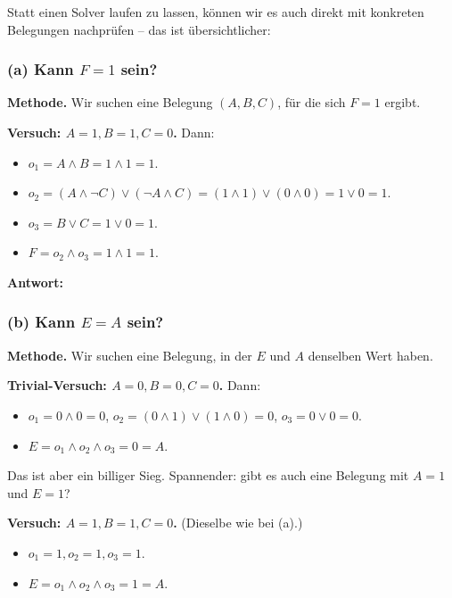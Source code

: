 \documentclass[a4paper,12pt]{article}
\begin{document}
Statt einen Solver laufen zu lassen, k\"onnen wir es auch direkt mit
konkreten Belegungen nachpr\"ufen -- das ist \"ubersichtlicher:

\subsubsection*{(a) Kann $F = 1$ sein?}

\textbf{Methode.} Wir suchen eine Belegung $(A, B, C)$, f\"ur die
sich $F = 1$ ergibt.

\textbf{Versuch: $A = 1, B = 1, C = 0$.} Dann:
\begin{itemize}[nosep]
\item $o_1 = A \wedge B = 1 \wedge 1 = 1$.
\item $o_2 = (A \wedge \neg C) \vee (\neg A \wedge C) =
      (1 \wedge 1) \vee (0 \wedge 0) = 1 \vee 0 = 1$.
\item $o_3 = B \vee C = 1 \vee 0 = 1$.
\item $F = o_2 \wedge o_3 = 1 \wedge 1 = 1$. \checkmark
\end{itemize}

\textbf{Antwort:} 

\subsubsection*{(b) Kann $E = A$ sein?}

\textbf{Methode.} Wir suchen eine Belegung, in der $E$ und $A$
denselben Wert haben.

\textbf{Trivial-Versuch: $A = 0, B = 0, C = 0$.} Dann:
\begin{itemize}[nosep]
\item $o_1 = 0 \wedge 0 = 0$, $o_2 = (0 \wedge 1) \vee (1 \wedge 0) = 0$,
      $o_3 = 0 \vee 0 = 0$.
\item $E = o_1 \wedge o_2 \wedge o_3 = 0 = A$. \checkmark
\end{itemize}

Das ist aber ein billiger Sieg. Spannender: gibt es auch eine
Belegung mit $A = 1$ und $E = 1$?

\textbf{Versuch: $A = 1, B = 1, C = 0$.} (Dieselbe wie bei (a).)
\begin{itemize}[nosep]
\item $o_1 = 1, o_2 = 1, o_3 = 1$.
\item $E = o_1 \wedge o_2 \wedge o_3 = 1 = A$. \checkmark
\end{itemize}
\end{document}

